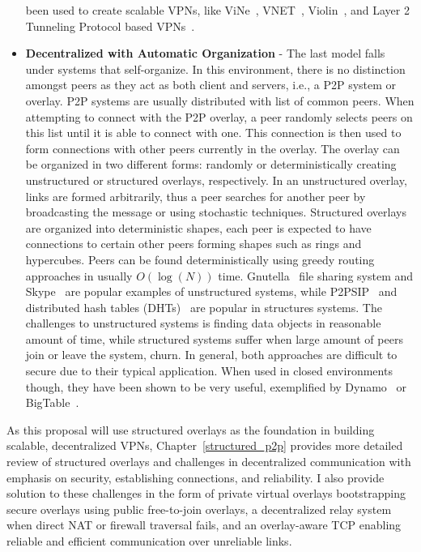 \begin{itemize}
been used to create scalable VPNs, like ViNe~\cite{vine}, VNET~\cite{vnet},
Violin~\cite{violin}, and Layer 2 Tunneling Protocol based VPNs~\cite{l2tp}.
\item \textbf{Decentralized with Automatic Organization} - The last model falls
under systems that self-organize.  In this environment, there is no distinction
amongst peers as they act as both client and servers, i.e., a P2P system or
overlay.  P2P systems are usually distributed with list of common peers.  When
attempting to connect with the P2P overlay, a peer randomly selects peers on
this list until it is able to connect with one.  This connection is then used
to form connections with other peers currently in the overlay.  The overlay
can be organized in two different forms: randomly or deterministically
creating unstructured or structured overlays, respectively.  In an unstructured
overlay, links are formed arbitrarily, thus a peer searches for another peer
by broadcasting the message or using stochastic techniques.  Structured
overlays are organized into deterministic shapes, each peer is expected to
have connections to certain other peers forming shapes such as rings and
hypercubes.  Peers can be found deterministically using greedy routing
approaches in usually $O(\log(N))$ time.  Gnutella~\cite{gnutella} file sharing
system and Skype~\cite{skype} are popular examples of unstructured systems,
while P2PSIP~\cite{p2psip} and distributed hash tables (DHTs)~\cite{chord} are
popular in structures systems.  The challenges to unstructured systems is
finding data objects in reasonable amount of time, while structured systems
suffer when large amount of peers join or leave the system, churn.  In general,
both approaches are difficult to secure due to their typical application.
When used in closed environments though, they have been shown to be very
useful, exemplified by Dynamo~\cite{dynamo} or BigTable~\cite{bigtable}.
\end{itemize}
As this proposal will use structured overlays as the foundation in building
scalable, decentralized VPNs, Chapter~\ref{structured_p2p} provides more
detailed review of structured overlays and challenges in decentralized
communication with emphasis on security, establishing connections, and
reliability.  I also provide solution to these challenges in the form of
private virtual overlays bootstrapping secure overlays using public
free-to-join overlays, a decentralized relay system when direct NAT or firewall
traversal fails, and an overlay-aware TCP enabling reliable and efficient
communication over unreliable links.

